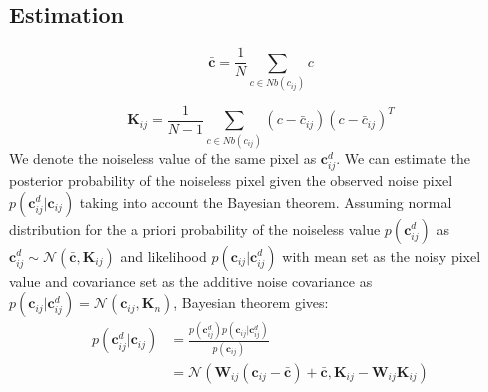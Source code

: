 \begin{appendices}

{\let\cleardoublepage\relax}
\appendix
\chapter{}
\section{Estimation}

 \citeauthor*{ac} \cite{ac} 
\blindtext  

\begin{comment}
\begin{figure}[H]
\begin{center}
  \texttt{[image: pixelnb.png]}
  \caption{The square neighborhood used for spatial denoising.}
  \label{fig:lbpschem}
\end{center}
\end{figure}
\end{comment} 

\begin{equation}
	\bar{\mathbf{c}} = \frac{1}{N}\sum_{c \in Nb(c_{ij}) }c 
\end{equation}

\begin{equation}
	\mathbf{K}_{ij} = \frac{1}{N-1}\sum_{c \in Nb(c_{ij})}(c-\bar{c}_{ij})(c-\bar{c}_{ij})^T
\end{equation}
\noindent We denote the noiseless value of the same pixel as $\mathbf{c}_{ij}^{d}$. We can estimate the posterior probability of the noiseless pixel given the observed noise pixel $p(\mathbf{c}_{ij}^{d}|\mathbf{c}_{ij})$ taking into account the Bayesian theorem. Assuming normal distribution for the a priori probability of the noiseless value $p(\mathbf{c}_{ij}^{d})$ as $\mathbf{c}_{ij}^{d}\sim \mathcal{N} (\bar{\mathbf{c}}, \mathbf{K}_{ij})$ and likelihood $p(\mathbf{c}_{ij}|\mathbf{c}_{ij}^{d})$ with mean set as the noisy pixel value and covariance set as the additive noise covariance as $p(\mathbf{c}_{ij}|\mathbf{c}_{ij}^{d}) = \mathcal{N} (\mathbf{c}_{ij}, \mathbf{K}_{n})$, Bayesian theorem gives:
\begin{align}
	p(\mathbf{c}_{ij}^{d}|\mathbf{c}_{ij}) &= \frac{p(\mathbf{c}_{ij}^{d})p(\mathbf{c}_{ij}|\mathbf{c}_{ij}^{d})}{p(\mathbf{c}_{ij})} \nonumber \\
		&= \mathcal{N} (\mathbf{W}_{ij}(\mathbf{c}_{ij}-\bar{\mathbf{c}})+\bar{\mathbf{c}}, \mathbf{K}_{ij} - \mathbf{W}_{ij}\mathbf{K}_{ij})
\end{align}


\end{appendices}
